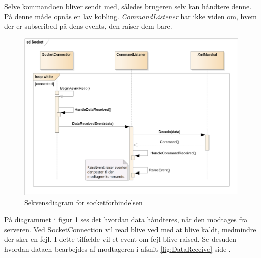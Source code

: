 Selve kommandoen bliver sendt med, således brugeren selv kan håndtere denne.\\
På denne måde opnås en lav kobling. \textit{CommandListener} har ikke viden om, hvem der er subscribed på dens events, den raiser dem bare.

\begin{figure}[H]
	\centering
	\includegraphics[width=1\textwidth]{Systemdesign/SharedLib/Images/Socket.png}
	\caption{Sekvensdiagram for socketforbindelsen}
	\label{fig:sockit}
\end{figure}

På diagrammet i figur \ref{fig:sockit} ses det hvordan data håndteres, når den modtages fra serveren. Ved SocketConnection vil read blive ved med at blive kaldt, medmindre der sker en fejl. I dette tilfælde vil et event om fejl blive raised. Se desuden hvordan dataen bearbejdes af modtageren i afsnit \ref{fig:DataReceive} side \pageref{fig:DataReceive}.
 
